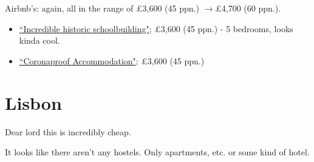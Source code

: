 \documentclass[12pt]{article}
\renewcommand{\to}{$\rightarrow$}
\newcommand{\cost}[2]{\pounds#1 (#2 ppn.)}
\begin{document}
	Airbnb's: again, all in the range of \cost{3,600}{45} \to \cost{4,700}{60}.
	\begin{itemize}
		\item \href{https://www.airbnb.co.uk/rooms/1648803?adults=10&check_in=2022-05-28&check_out=2022-06-05&federated_search_id=eacbb969-9448-48b4-b093-cfbc72c92868&source_impression_id=p3_1648314361_IUXtwtjrC12BznH9}{``Incredible historic schoolbuilding"}; \cost{3,600}{45} - 5 bedrooms, looks kinda cool.
		\item 
		\href{https://www.airbnb.co.uk/rooms/14224936?adults=10&check_in=2022-05-28&check_out=2022-06-05&federated_search_id=eacbb969-9448-48b4-b093-cfbc72c92868&source_impression_id=p3_1648314565_rybHsVBrlbjEOZeR}{``Coronaproof Accommodation"}; \cost{3,600}{45}
	\end{itemize}
	\section{Lisbon}
	Dear lord this is incredibly cheap.	
	
	It looks like there aren't any hostels. Only apartments, etc. or some kind of hotel. 
	
\end{document}
